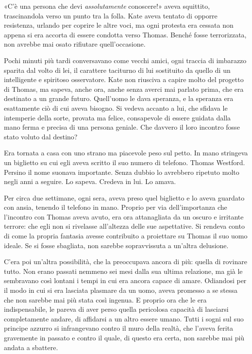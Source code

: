 \documentclass[a4paper,oneside,11pt]{memoir}
\begin{document}
«C'è una persona che devi \emph{assolutamente} conoscere!» aveva squittito,
trascinandola verso un punto tra la folla. Kate aveva tentato di opporre
resistenza, urlando per coprire le altre voci, ma ogni protesta era cessata non
appena si era accorta di essere condotta verso Thomas. Benché fosse
terrorizzata, non avrebbe mai osato rifiutare quell'occasione.

Pochi minuti più tardi conversavano come vecchi amici, ogni traccia di imbarazzo
sparita dal volto di lei, il carattere taciturno di lui sostituito da quello di
un intelligente e spiritoso osservatore. Kate non riusciva a capire molto del
progetto di Thomas, ma sapeva, anche ora, anche senza averci mai parlato prima,
che era destinato a un grande futuro. Quell'uomo le dava speranza, e la speranza
era esattamente ciò di cui aveva bisogno. Si vedeva accanto a lui, che sfidava
le intemperie della sorte, provata ma felice, consapevole di essere guidata
dalla mano ferma e precisa di una persona geniale. Che davvero il loro incontro
fosse stato voluto dal destino?

Era tornata a casa con uno strano ma piacevole peso sul petto. In mano stringeva
un biglietto su cui egli aveva scritto il suo numero di telefono. Thomas
Westford. Persino il nome suonava importante. Senza dubbio lo avrebbero ripetuto
molto negli anni a seguire. Lo sapeva. Credeva in lui. Lo amava.

Per circa due settimane, ogni sera, aveva preso quel biglietto e lo aveva
guardato con ansia, tenendo il telefono in mano. Proprio per via dell'importanza
che l'incontro con Thomas aveva avuto, era ora attanagliata da un oscuro e
irritante terrore: che egli non si rivelasse all'altezza delle sue aspettative.
Si rendeva conto di come la propria fantasia avesse contribuito a proiettare su
Thomas il suo uomo ideale. Se si fosse sbagliata, non sarebbe sopravvissuta a
un'altra delusione.

C'era poi un'altra possibilità, che la preoccupava ancora di più: quella di
rovinare tutto. Non erano passati nemmeno sei mesi dalla sua ultima relazione,
ma già le sembravano così lontani i tempi in cui era ancora capace di amare.
Odiandosi per il modo in cui si era lasciata plasmare da un uomo, aveva promesso
a se stessa che non sarebbe mai più stata così ingenua. E proprio ora che le era
indispensabile, le pareva di aver perso quella pericolosa capacità di lasciarsi
completamente andare, di affidarsi a un altro essere umano. Tutti i sogni sul
suo principe azzurro si infrangevano contro il muro della realtà, che l'aveva
ferita gravemente in passato e contro il quale, di questo era certa, non sarebbe
mai più andata a sbattere.
\end{document}
